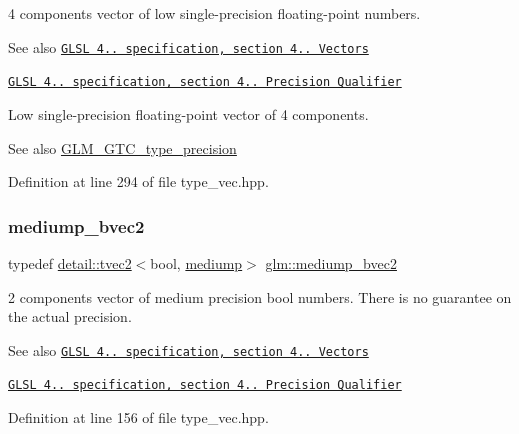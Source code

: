 4 components vector of low single-\/precision floating-\/point numbers.

\begin{DoxySeeAlso}{See also}
\href{http://www.opengl.org/registry/doc/GLSLangSpec.4.20.8.pdf}{\tt G\+L\+SL 4.. specification, section 4.. Vectors} 

\href{http://www.opengl.org/registry/doc/GLSLangSpec.4.20.8.pdf}{\tt G\+L\+SL 4.. specification, section 4.. Precision Qualifier}
\end{DoxySeeAlso}
Low single-\/precision floating-\/point vector of 4 components. \begin{DoxySeeAlso}{See also}
\hyperlink{group__gtc__type__precision}{G\+L\+M\+\_\+\+G\+T\+C\+\_\+type\+\_\+precision} 
\end{DoxySeeAlso}


Definition at line 294 of file type\+\_\+vec.\+hpp.

\mbox{\label{group__core__precision_ga1406d96eb96694d91052d3f882658ab2}} 
\subsubsection{\texorpdfstring{mediump\+\_\+bvec2}{mediump\_bvec2}}
{\footnotesize\ttfamily typedef \hyperlink{structglm_1_1detail_1_1tvec2}{detail\+::tvec2}$<$bool, \hyperlink{namespaceglm_a0f04f086094c747d227af4425893f545a6416f3ea0c9025fb21ed50c4d6620482}{mediump}$>$ \hyperlink{group__core__precision_ga1406d96eb96694d91052d3f882658ab2}{glm\+::mediump\+\_\+bvec2}}

2 components vector of medium precision bool numbers. There is no guarantee on the actual precision.

\begin{DoxySeeAlso}{See also}
\href{http://www.opengl.org/registry/doc/GLSLangSpec.4.20.8.pdf}{\tt G\+L\+SL 4.. specification, section 4.. Vectors} 

\href{http://www.opengl.org/registry/doc/GLSLangSpec.4.20.8.pdf}{\tt G\+L\+SL 4.. specification, section 4.. Precision Qualifier} 
\end{DoxySeeAlso}


Definition at line 156 of file type\+\_\+vec.\+hpp.

\mbox{\label{group__core__precision_gae7c8d0136e829d6fe3feb00856e35f11}} 
